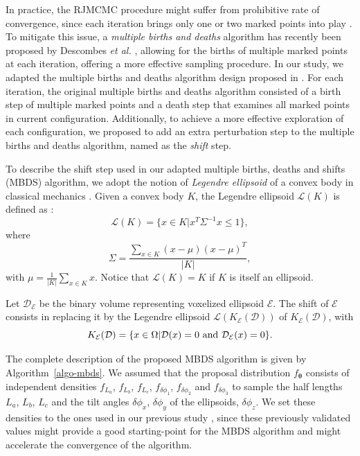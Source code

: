 \documentclass[journal]{IEEEtran}
\begin{document}
In practice, the RJMCMC procedure might suffer from prohibitive rate
of convergence, since each iteration brings only one or two marked
points into play \cite{descombes2013stochastic}. To mitigate this
issue, a \textit{multiple births and deaths} algorithm has recently
been proposed by Descombes \textit{et al.} \cite{descombes2009object},
allowing for the births of multiple marked points at each iteration,
offering a more effective sampling procedure. In our study, we adapted
the multiple births and deaths algorithm design proposed in
\cite{descombes2009object}. For each iteration, the original multiple
births and deaths algorithm consisted of a birth step of multiple
marked points and a death step that examines all marked points in
current configuration. Additionally, to achieve a more effective
exploration of each configuration, we proposed to add an extra
perturbation step to the multiple births and deaths algorithm, named
as the \textit{shift} step.

To describe the shift step used in our adapted multiple births, deaths
and shifts (MBDS) algorithm, we adopt the notion of \textit{Legendre
  ellipsoid} of a convex body in classical mechanics
\cite{lutwak2000new}. Given a convex body $K$, the Legendre ellipsoid
$\mathcal{L}(K)$ is defined as \cite{ludwig2003ellipsoids}:
\begin{equation}
  \label{eq:legendre-ellip-orig}
  \mathcal{L}(K) = \{ x \in K | x^T \Sigma^{-1} x \leq 1 \},
\end{equation}
where
\begin{equation}
  \label{eq:legendre-ellip-cov}
  \Sigma = \frac{\sum_{x \in K} (x - \mu)(x - \mu)^T} {|K|},
\end{equation}
with $\mu = \frac{1}{|K|} \sum_{x \in K} x$. Notice that
$\mathcal{L}(K) = K$ if $K$ is itself an ellipsoid.

Let $\mathcal{D}_{\mathcal{E}}$ be the binary volume representing
voxelized ellipsoid $\mathcal{E}$. The shift of $\mathcal{E}$ consists
in replacing it by the Legendre ellipsoid
$\mathcal{L}(K_{\mathcal{E}}(\mathcal{D}))$ of
$K_{\mathcal{E}}(\mathcal{D})$, with
\begin{equation}
  \label{eq:legendre-ellip}
  K_{\mathcal{E}}(\mathcal{D}) = \{x \in \Omega |
  \mathcal{D}(x) = 0 \textnormal{ and } \mathcal{D}_{\mathcal{E}}(x) = 0 \}.
\end{equation}

The complete description of the proposed MBDS algorithm is given by
Algorithm~\ref{algo-mbds}. We assumed that the proposal distribution
$f_{\boldsymbol{\theta}}$ consists of independent densities $f_{L_a}$,
$f_{L_b}$, $f_{L_c}$, $f_{\delta{\phi_1}}$, $f_{\delta{\phi_2}}$ and
$f_{\delta{\phi_3}}$ to sample the half lengths $L_a$, $L_b$, $L_c$
and the tilt angles $\delta{\phi_x}$, $\delta{\phi_y}$ of the
ellipsoids, $\delta{\phi_z}$. We set these densities to the ones used
in our previous study \cite{li2016novel}, since these previously
validated values might provide a good starting-point for the MBDS
algorithm and might accelerate the convergence of the algorithm.
\end{document}
